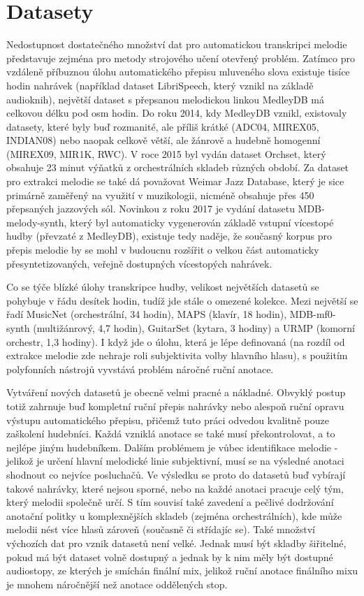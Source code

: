 \chapter{Datasety}

Nedostupnost dostatečného množství dat pro automatickou transkripci melodie představuje zejména pro metody strojového učení otevřený problém. Zatímco pro vzdáleně příbuznou úlohu automatického přepisu mluveného slova existuje tisíce hodin nahrávek (například dataset LibriSpeech, který vznikl na základě audioknih), největší dataset s přepsanou melodickou linkou MedleyDB má celkovou délku pod osm hodin. Do roku 2014, kdy MedleyDB vznikl, existovaly datasety, které byly buď rozmanité, ale příliš krátké (ADC04, MIREX05, INDIAN08) nebo naopak celkově větší, ale žánrově a hudebně homogenní (MIREX09, MIR1K, RWC). V roce 2015 byl vydán dataset Orchset, který obsahuje 23 minut výňatků z orchestrálních skladeb různých období. Za dataset pro extrakci melodie se také dá považovat Weimar Jazz Database, který je sice primárně zaměřený na využití v muzikologii, nicméně obsahuje přes 450 přepsaných jazzových sól. Novinkou z roku 2017 je vydání datasetu MDB-melody-synth, který byl automaticky vygenerován základě vstupní vícestopé hudby (převzaté z MedleyDB), existuje tedy naděje, že současný korpus pro přepis melodie by se mohl v budoucnu rozšířit o velkou část automaticky přesyntetizovaných, veřejně dostupných vícestopých nahrávek.

Co se týče blízké úlohy transkripce hudby, velikost největších datasetů se pohybuje v řádu desítek hodin, tudíž jde stále o omezené kolekce. Mezi největší se řadí MusicNet (orchestrální, 34 hodin), MAPS (klavír, 18 hodin), MDB-mf0-synth (multižánrový, 4,7 hodin), GuitarSet (kytara, 3 hodiny) a URMP (komorní orchestr, 1,3 hodiny). I když jde o úlohu, která je lépe definovaná (na rozdíl od extrakce melodie zde nehraje roli subjektivita volby hlavního hlasu), s použitím polyfonních nástrojů vyvstává problém náročné ruční anotace.

Vytváření nových datasetů je obecně velmi pracné a nákladné. Obvyklý postup totiž zahrnuje buď kompletní ruční přepis nahrávky nebo alespoň ruční opravu výstupu automatického přepisu, přičemž tuto práci odvedou kvalitně pouze zaškolení hudebníci. Každá vzniklá anotace se také musí překontrolovat, a to nejlépe jiným hudebníkem. Dalším problémem je vůbec identifikace melodie - jelikož je určení hlavní melodické linie subjektivní, musí se na výsledné anotaci shodnout co nejvíce posluchačů. Ve výsledku se proto do datasetů buď vybírají takové nahrávky, které nejsou sporné, nebo na každé anotaci pracuje celý tým, který melodii společně určí. S tím souvisí také zavedení a pečlivé dodržování anotační politky u komplexnějších skladeb (zejména orchestrálních), kde může melodii nést více hlasů zároveň (současně či střídajíc se). Také množství výchozích dat pro vznik datasetů není velké. Jednak musí být skladby šiřitelné, pokud má být dataset volně dostupný a jednak by k nim měly být dostupné audiostopy, ze kterých je smíchán finální mix, jelikož ruční anotace finálního mixu je mnohem náročnější než anotace oddělených stop.

